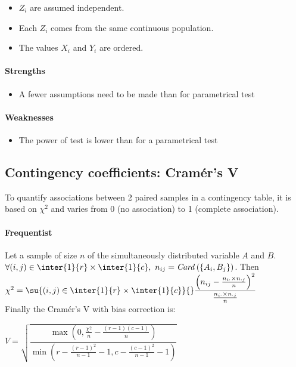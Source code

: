 \begin{itemize}
    \item $Z_{i}$ are assumed independent.
    \item Each $Z_{i}$ comes from the same continuous population.
    \item The values $X_{i}$ and $Y_{i}$ are ordered.
\end{itemize}

\paragraph{Strengths}
\begin{itemize}
    \item A fewer assumptions need to be made than for parametrical test
\end{itemize}

\paragraph{Weaknesses}
\begin{itemize}
    \item The power of test is lower than for a parametrical test
\end{itemize}



\subsection{Contingency coefficients: Cramér's V}
To quantify associations between 2 paired samples in a contingency table, it is based
on $\chi^{2}$ and varies from 0 (no association) to 1 (complete association).
\paragraph{Frequentist}
Let a sample of size $n$ of the simultaneously distributed variable $A$ and $B$.
$\forall (i,j)\in\inter{1}{r}\times\inter{1}{c},~n_{ij} = \text{\emph{Card}}\left(
\left\{A_{i},B_{j}\right\}\right)$.
Then $\chi^{2} = \su{(i,j)\in\inter{1}{r}\times\inter{1}{c}}{}\dfrac{\left(n_{ij} - \frac{
n_{i\cdot}\times n_{\cdot j}}{n}\right)^{2}}{\frac{n_{i\cdot}\times n_{\cdot j}}{n}}$\\
Finally the Cramér's V with bias correction is: 
\begin{center}
    $V = \sqrt{\dfrac{\max\left(0, \frac{\chi^{2}}{n} - \frac{(r-1)(c-1)}{n}\right)}{\min\left(r-\frac{(r-1)^{2}}{n-1}-1, c-\frac{(c-1)^{2}}{n-1}-1\right)}}$
\end{center}

